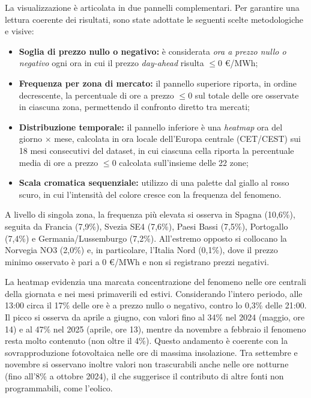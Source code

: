 La visualizzazione è articolata in due pannelli complementari. Per garantire una lettura coerente dei risultati, sono state adottate le seguenti scelte metodologiche e visive:
\begin{itemize}
    \item \textbf{Soglia di prezzo nullo o negativo:} è considerata \textit{ora a prezzo nullo o negativo} ogni ora in cui il prezzo \textit{day-ahead} risulta $\leq 0$ €/MWh;
    \item \textbf{Frequenza per zona di mercato:} il pannello superiore riporta, in ordine decrescente, la percentuale di ore a prezzo $\leq 0$ sul totale delle ore osservate in ciascuna zona, permettendo il confronto diretto tra mercati;
    \item \textbf{Distribuzione temporale:} il pannello inferiore è una \textit{heatmap} ora del giorno $\times$ mese, calcolata in ora locale dell'Europa centrale (CET/CEST) sui 18 mesi consecutivi del dataset, in cui ciascuna cella riporta la percentuale media di ore a prezzo $\leq 0$ calcolata sull'insieme delle 22 zone;
    \item \textbf{Scala cromatica sequenziale:} utilizzo di una palette dal giallo al rosso scuro, in cui l'intensità del colore cresce con la frequenza del fenomeno.
\end{itemize}

A livello di singola zona, la frequenza più elevata si osserva in Spagna (10,6\%), seguita da Francia (7,9\%), Svezia SE4 (7,6\%), Paesi Bassi (7,5\%), Portogallo (7,4\%) e Germania/Lussemburgo (7,2\%). All'estremo opposto si collocano la Norvegia NO3 (2,0\%) e, in particolare, l'Italia Nord (0,1\%), dove il prezzo minimo osservato è pari a 0 €/MWh e non si registrano prezzi negativi.

La heatmap evidenzia una marcata concentrazione del fenomeno nelle ore centrali della giornata e nei mesi primaverili ed estivi. Considerando l'intero periodo, alle 13:00 circa il 17\% delle ore è a prezzo nullo o negativo, contro lo 0,3\% delle 21:00. Il picco si osserva da aprile a giugno, con valori fino al 34\% nel 2024 (maggio, ore 14) e al 47\% nel 2025 (aprile, ore 13), mentre da novembre a febbraio il fenomeno resta molto contenuto (non oltre il 4\%). Questo andamento è coerente con la sovrapproduzione fotovoltaica nelle ore di massima insolazione. Tra settembre e novembre si osservano inoltre valori non trascurabili anche nelle ore notturne (fino all'8\% a ottobre 2024), il che suggerisce il contributo di altre fonti non programmabili, come l'eolico.

